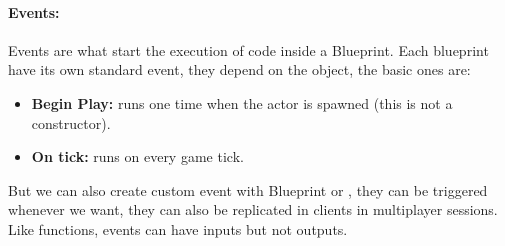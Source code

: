 \paragraph{Events:}
Events are what start the execution of code inside a Blueprint. Each blueprint have its own standard event, they depend on the object, the basic ones are:
\begin{itemize}
  \item \textbf{Begin Play:} runs one time when the actor is spawned (this is not a constructor).
  \item \textbf{On tick:} runs on every game tick.
\end{itemize}
\noindent
But we can also create custom event with Blueprint or \cpp, they can be triggered whenever we want, they can also be replicated in clients in multiplayer sessions. 
Like functions, events can have inputs but not outputs.

